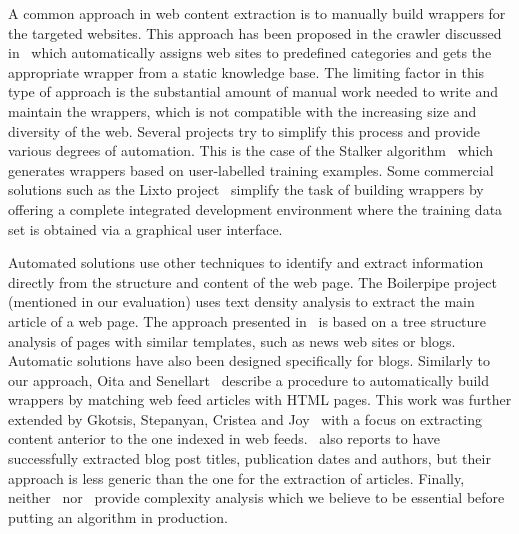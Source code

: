 A common approach in web content extraction is to manually build wrappers for the targeted websites. This approach has been proposed in the crawler discussed in~\cite{faheem2012intelligent} which automatically assigns web sites to predefined categories and gets the appropriate wrapper from a static knowledge base. The limiting factor in this type of approach is the substantial amount of manual work needed to write and maintain the wrappers, which is not compatible with the increasing size and diversity of the web. Several projects try to simplify this process and provide various degrees of automation. This is the case of the Stalker algorithm~\cite{stalker} which generates wrappers based on user-labelled training examples. Some commercial solutions such as the Lixto project~\cite{lixto} simplify the task of building wrappers by offering a complete integrated development environment where the training data set is obtained via a graphical user interface.

Automated solutions use other techniques to identify and extract information directly from the structure and content of the web page. The Boilerpipe project~\cite{kohlschuetter2010} (mentioned in our evaluation) uses text density analysis to extract the main article of a web page. The approach presented in~\cite{treeedit} is based on a tree structure analysis of pages with similar templates, such as news web sites or blogs. Automatic solutions have also been designed specifically for blogs. Similarly to our approach, Oita and Senellart~\cite{oita2010} describe a procedure to automatically build wrappers by matching web feed articles with HTML pages. This work was further extended by Gkotsis, Stepanyan, Cristea and Joy~\cite{gkotsis2013} with a focus on extracting content anterior to the one indexed in web feeds.~\cite{gkotsis2013} also reports to have successfully extracted blog post titles, publication dates and authors, but their approach is less generic than the one for the extraction of articles. Finally, neither~\cite{oita2010} nor~\cite{gkotsis2013} provide complexity analysis which we believe to be essential before putting an algorithm in production.

